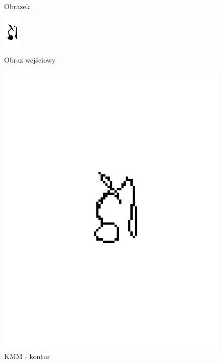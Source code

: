 \documentclass[11pt]{article}
\begin{document}
\begin{figure}[!ht] 
  \caption{Obrazek}
  \label{ fig7} 
  \begin{minipage}[b]{0.5\linewidth}
    \centering
    \includegraphics[width=.5\linewidth]{../images/sample1} 
    \caption{Obraz wejściowy} 
    \vspace{4ex}
  \end{minipage}%
  \begin{minipage}[b]{0.5\linewidth}
    \centering
    \includegraphics[width=.5\linewidth]{../samples/sample1_kmm_contour} 
    \caption{KMM - kontur} 
    \vspace{4ex}
  \end{minipage} 
  \begin{minipage}[b]{0.5\linewidth}

\end{minipage}
\end{figure}
\end{document}
